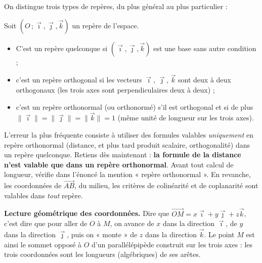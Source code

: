 \documentclass[11pt]{article}
\newcommand{\cle}[1]{{\popxbold\color{popdark}#1}}
\begin{document}
On distingue trois types de repères, du plus général au plus particulier :

\begin{definition}
Soit $(O\,;\vec{\imath},\vec{\jmath},\vec{k})$ un repère de l'espace.
\begin{itemize}
\item C'est un repère \cle{quelconque} si $(\vec{\imath},\vec{\jmath},\vec{k})$ est une base sans autre condition ;
\item c'est un repère \cle{orthogonal} si les vecteurs $\vec{\imath}$, $\vec{\jmath}$, $\vec{k}$ sont deux à deux orthogonaux (les trois axes sont perpendiculaires deux à deux) ;
\item c'est un repère \cle{orthonormal} (ou orthonormé) s'il est orthogonal et si de plus $\|\vec{\imath}\|=\|\vec{\jmath}\|=\|\vec{k}\|=1$ (même unité de longueur sur les trois axes).
\end{itemize}
\end{definition}

\begin{attention}
L'erreur la plus fréquente consiste à utiliser des formules valables \emph{uniquement} en repère orthonormal (distance, et plus tard produit scalaire, orthogonalité) dans un repère quelconque. Retiens dès maintenant : \textbf{la formule de la distance n'est valable que dans un repère orthonormal}. Avant tout calcul de longueur, vérifie dans l'énoncé la mention « repère orthonormal ». En revanche, les coordonnées de $\overrightarrow{AB}$, du milieu, les critères de colinéarité et de coplanarité sont valables dans \emph{tout} repère.
\end{attention}

\textbf{Lecture géométrique des coordonnées.} Dire que $\overrightarrow{OM}=x\vec{\imath}+y\vec{\jmath}+z\vec{k}$, c'est dire que pour aller de $O$ à $M$, on avance de $x$ dans la direction $\vec{\imath}$, de $y$ dans la direction $\vec{\jmath}$, puis on « monte » de $z$ dans la direction $\vec{k}$. Le point $M$ est ainsi le sommet opposé à $O$ d'un \cle{parallélépipède} construit sur les trois axes : les trois coordonnées sont les longueurs (algébriques) de ses arêtes.
\end{document}
